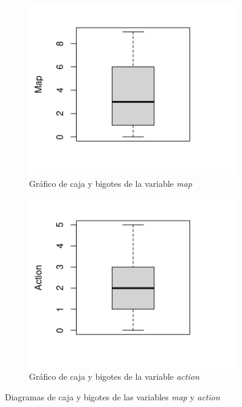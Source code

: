 \begin{figure}[!tbp]
  \begin{subfigure}[b]{0.49\textwidth}
    \includegraphics[width=\textwidth, height=\textwidth]{imagenes/Rplot02.png}
    \caption{Gráfico de caja y bigotes de la variable \emph{map}}
    \label{fig:boxplotmap}
  \end{subfigure}
  \hfill
  \begin{subfigure}[b]{0.49\textwidth}
    \includegraphics[width=\textwidth, height=\textwidth]{imagenes/Rplot04.png}
    \caption{Gráfico de caja y bigotes de la variable \emph{action}}
    \label{fig:boxplotaction}
  \end{subfigure}
  \caption{Diagramas de caja y bigotes de las variables \emph{map} y \emph{action}}
\end{figure}

